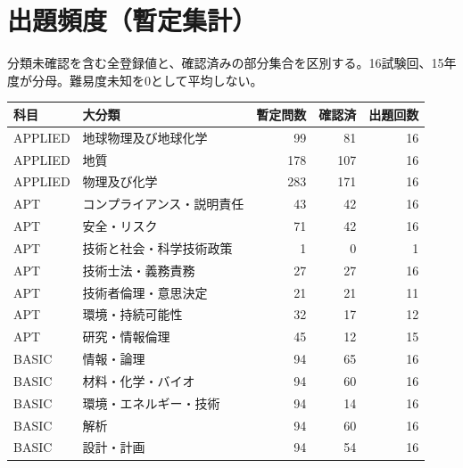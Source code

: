 \chapter{出題頻度（暫定集計）}
分類未確認を含む全登録値と、確認済みの部分集合を区別する。16試験回、15年度が分母。難易度未知を0として平均しない。
\begin{longtable}{p{.16\linewidth}p{.42\linewidth}rrr}
科目 & 大分類 & 暫定問数 & 確認済 & 出題回数\\\hline
APPLIED & 地球物理及び地球化学 & 99 & 81 & 16\\
APPLIED & 地質 & 178 & 107 & 16\\
APPLIED & 物理及び化学 & 283 & 171 & 16\\
APT & コンプライアンス・説明責任 & 43 & 42 & 16\\
APT & 安全・リスク & 71 & 42 & 16\\
APT & 技術と社会・科学技術政策 & 1 & 0 & 1\\
APT & 技術士法・義務責務 & 27 & 27 & 16\\
APT & 技術者倫理・意思決定 & 21 & 21 & 11\\
APT & 環境・持続可能性 & 32 & 17 & 12\\
APT & 研究・情報倫理 & 45 & 12 & 15\\
BASIC & 情報・論理 & 94 & 65 & 16\\
BASIC & 材料・化学・バイオ & 94 & 60 & 16\\
BASIC & 環境・エネルギー・技術 & 94 & 14 & 16\\
BASIC & 解析 & 94 & 60 & 16\\
BASIC & 設計・計画 & 94 & 54 & 16\\
\end{longtable}
